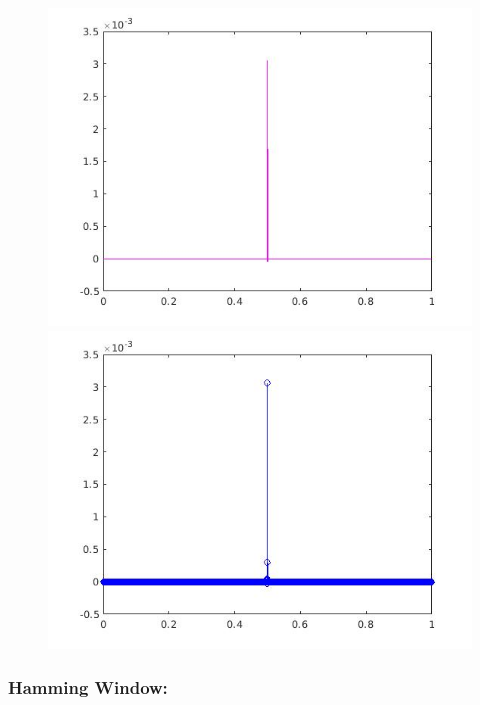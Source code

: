 \documentclass[a4paper,11pt]{article}
\begin{document}
\begin{figure}[!hp]
\centering
\begin{minipage}{.5\textwidth}
  \centering
  \includegraphics[width=1\linewidth]{images/lab2_24.jpg}
\end{minipage}%
\begin{minipage}{.5\textwidth}
  \centering
  \includegraphics[width=1\linewidth]{images/lab2_25.jpg}
\end{minipage}
\end{figure}

\subsubsection{Hamming Window:}
\end{document}
